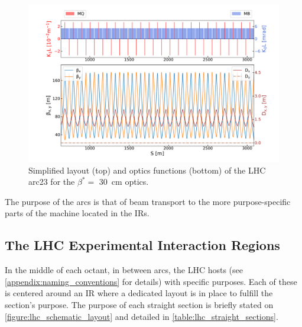 \begin{figure}[!hbt]
  \centering
  \includegraphics*[width=\linewidth]{Figures/Optics_Measurements_Corrections_at_LHC/lhc_arc23.pdf}
  \caption{Simplified layout (top) and optics functions (bottom) of the LHC arc\num{23} for the \(\beta^{\ast} =\) \qty{30}{\centi\meter} optics.}
  \label{figure:lhc_arc23_latwiss}
\end{figure}

The purpose of the arcs is that of beam transport to the more purpose-specific parts of the machine located in the \glspl{IR}.

\subsection{The LHC Experimental Interaction Regions}
\label{subsection:lhc_eirs}

In the middle of each octant, in between arcs, the \gls{LHC} hosts  (see \cref{appendix:naming_conventions} for details) with specific purposes.
Each of these is centered around an \acrfull{IR} where a dedicated layout is in place to fulfill the section's purpose.
The purpose of each straight section is briefly stated on \cref{figure:lhc_schematic_layout} and detailed in \cref{table:lhc_straight_sections}.
\\

